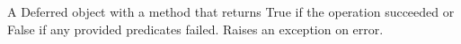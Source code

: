 A Deferred object with a  method that returns True if the operation
succeeded or False if any provided predicates failed.  Raises an exception on
error.
